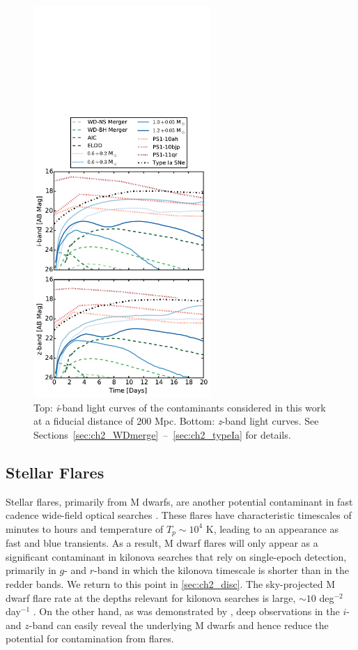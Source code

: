 \begin{figure}[h!]
\centering
\includegraphics[trim= 0 0 0 240 ,clip,width=0.6\textwidth]{./figs/chapter2/ch2_f2.pdf}
\caption{Top: {\em i}-band light curves of the contaminants considered in this work at a fiducial distance of 200 Mpc. Bottom: {\em z}-band light curves. See Sections~\ref{sec:ch2_WDmerge}~--~\ref{sec:ch2_typeIa} for details.}
\label{fig:ch2_LCcont}
\end{figure}

\subsection{Stellar Flares}
\label{sec:ch2_flarestar}
Stellar flares, primarily from M dwarfs, are another potential contaminant in fast cadence wide-field optical searches \citep{Becker+04,KulkarniRau06,Berger+13}.  These flares have characteristic timescales of minutes to hours \citep[see e.g.,][]{Berger+13} and temperature of $T_p \sim 10^4$ K, leading to an appearance as fast and blue transients.  As a result, M dwarf flares will only appear as a significant contaminant in kilonova searches that rely on single-epoch detection, primarily in $g$- and $r$-band in which the kilonova timescale is shorter than in the redder bands.  We return to this point in \autoref{sec:ch2_disc}.  The sky-projected M dwarf flare rate at the depths relevant for kilonova searches is large, $\sim 10$ deg$^{-2}$ day$^{-1}$ \citep{KulkarniRau06}.  On the other hand, as was demonstrated by \citet{Berger+13}, deep observations in the $i$- and $z$-band can easily reveal the underlying M dwarfs and hence reduce the potential for contamination from flares.


